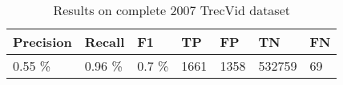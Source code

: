 













\begin{table}[ht]
	\centering
	\begin{tabular}{l|l|l||l|l|l|l}
	Precision & Recall & F1 & TP & FP & TN & FN \\ \hline
	0.55 \% & 0.96 \% & 0.7 \% & 1661 & 1358 & 532759 & 69 \\ 
	\end{tabular}

	\caption{Results on complete 2007 TrecVid dataset}
	\label{tab:hard_cut_results}
\end{table}

